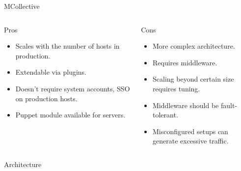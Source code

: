 \documentclass[presentation]{beamer}
\begin{document}
{
\begin{frame}[label=sec-10-4]{MCollective}

\begin{columns}
\begin{column}{0.5\textwidth}
\begin{block}{Pros}

\begin{itemize}
\item Scales with the number of hosts in production.
\item Extendable via plugins.
\item Doesn't require system accounts, SSO on production hosts.
\item Puppet module available for servers.
\end{itemize}
\end{block}
\end{column}

\begin{column}{0.5\textwidth}
\begin{block}{Cons}

\begin{itemize}
\item More complex architecture.
\item Requires middleware.
\item Scaling beyond certain size requires tuning.
\item Middleware should be fault-tolerant.
\item Misconfigured setups can generate excessive traffic.
\end{itemize}
\end{block}
\end{column}
\end{columns}
\end{frame}
} %

{
\begin{frame}[label=sec-10-5]{Architecture}

\end{frame}
} %
\end{document}
